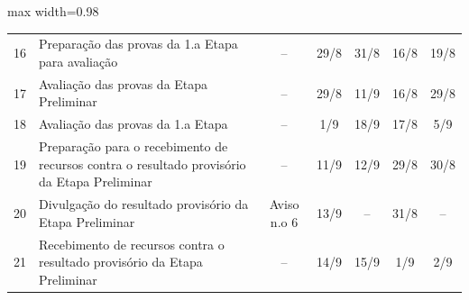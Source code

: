 \begin{landscape}
\begin{quadro}[htb]
\begin{adjustbox}{max width=0.98\linewidth}
\begin{tabular}{|c|l|c|c|c|c|c|}
16 & Preparação das provas   da 1.a Etapa para avaliação                                                                                        & –                   & 29/8                                                                            & 31/8                                  & 16/8                                                                            & 19/8                 \\
\rowcolor[HTML]{FCD5B4} 
17 & Avaliação das provas   da Etapa Preliminar                                                                                                 & –                   & 29/8                                                                            & 11/9                                  & 16/8                                                                            & 29/8                 \\
\rowcolor[HTML]{FCD5B4} 
18 & Avaliação das provas   da 1.a Etapa                                                                                                        & –                   & 1/9                                                                             & 18/9                                  & 17/8                                                                            & 5/9                  \\
19 & Preparação para o   recebimento de recursos contra o resultado provisório da Etapa Preliminar                                              & –                   & 11/9                                                                            & 12/9                                  & 29/8                                                                            & 30/8                 \\
\rowcolor[HTML]{92CDDC} 
20 & Divulgação do   resultado provisório da Etapa Preliminar                                                                                   & Aviso n.o 6         & 13/9                                                                            & –                                     & 31/8                                                                            & –                    \\
21 & Recebimento de   recursos contra o resultado provisório da Etapa Preliminar                                                                & –                   & 14/9                                                                            & 15/9                                  & 1/9                                                                             & 2/9                  \\

\end{tabular}
\end{adjustbox}
\end{quadro}
\end{landscape}
